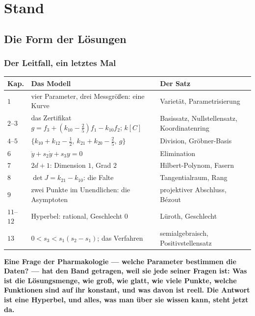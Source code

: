 \part{Stand}

\chapter{Die Form der Lösungen}

\section{Der Leitfall, ein letztes Mal}

\begin{merksatz}
\begin{center}
{\small
\renewcommand{\arraystretch}{1.46}
\begin{tabular}{@{}P{1.2cm}P{3.6cm}P{3.6cm}@{}}
\toprule
\textbf{Kap.} & \textbf{Das Modell} & \textbf{Der Satz}\\
\midrule
$1$ & vier Parameter, drei Messgrößen: eine Kurve & Varietät, Parametrisierung\\
$2$--$3$ & das Zertifikat $g = f_3 + (k_{10} - \tfrac25)f_1 - k_{10}f_2$; $k[C]$ & Basissatz, Nullstellensatz, Koordinatenring\\
$4$--$5$ & $\{k_{10} + k_{12} - \tfrac12,\ k_{21} + k_{20} - \tfrac25,\ g\}$ & Division, Gröbner-Basis\\
$6$ & $\ddot y + s_2\dot y + s_3y = 0$ & Elimination\\
$7$ & $2d + 1$: Dimension $1$, Grad $2$ & Hilbert-Polynom, Fasern\\
$8$ & $\det J = k_{21} - k_{10}$: die Falte & Tangentialraum, Rang\\
$9$ & zwei Punkte im Unendlichen: die Asymptoten & projektiver Abschluss, Bézout\\
$11$--$12$ & Hyperbel: rational, Geschlecht $0$ & Lüroth, Geschlecht\\
$13$ & $0 < s_3 < s_1(s_2 - s_1)$; das Verfahren & semialgebraisch, Positivstellensatz\\
\bottomrule
\end{tabular}}
\end{center}

\begin{center}
\begin{minipage}{0.9\textwidth}
\textbf{Eine Frage der Pharmakologie --- welche Parameter bestimmen die Daten? --- hat den Band getragen, weil sie jede seiner Fragen ist: Was ist die Lösungsmenge, wie groß, wie glatt, wie viele Punkte, welche Funktionen sind auf ihr konstant, und was davon ist reell. Die Antwort ist eine Hyperbel, und alles, was man über sie wissen kann, steht jetzt da.}
\end{minipage}
\end{center}
\end{merksatz}

